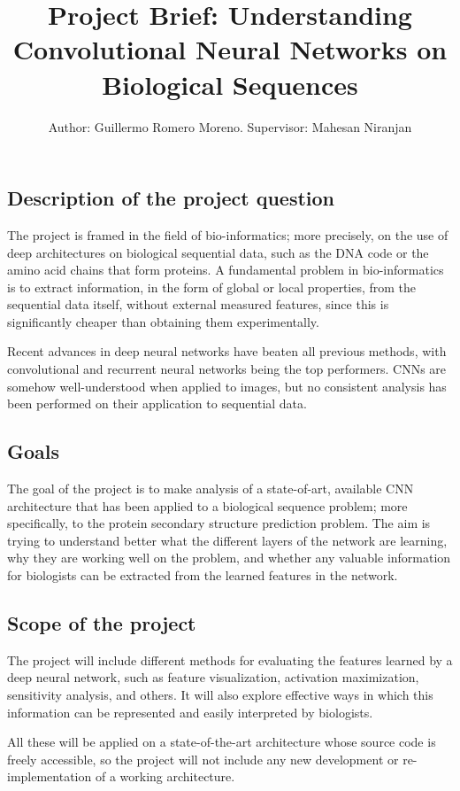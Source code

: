 \documentclass[]{scrartcl}
\title{Project Brief: Understanding Convolutional Neural Networks on Biological Sequences}
\author{Author: Guillermo Romero Moreno. Supervisor: Mahesan Niranjan}
\begin{document}
\maketitle

\subsection*{Description of the project question}
The project is framed in the field of bio-informatics; more precisely, on the use of deep architectures on biological sequential data, such as the DNA code or the amino acid chains that form proteins. A fundamental problem in bio-informatics is to extract information, in the form of global or local properties, from the sequential data itself, without external measured features, since this is significantly cheaper than obtaining them experimentally.

Recent advances in deep neural networks have beaten all previous methods, with convolutional and recurrent neural networks being the top performers. CNNs are somehow well-understood when applied to images, but no consistent analysis has been performed on their application to sequential data.

\subsection*{Goals}
The goal of the project is to make analysis of a state-of-art, available CNN architecture that has been applied to a biological sequence problem; more specifically, to the protein secondary structure prediction problem. The aim is trying to understand better what the different layers of the network are learning, why they are working well on the problem, and whether any valuable information for biologists can be extracted from the learned features in the network.

\subsection*{Scope of the project}
The project will include different methods for evaluating the features learned by a deep neural network, such as feature visualization, activation maximization, sensitivity analysis, and others. It will also explore effective ways in which this information can be represented and easily interpreted by biologists.

All these will be applied on a state-of-the-art architecture whose source code is freely accessible, so the project will not include any new development or re-implementation of a working architecture.
\end{document}
